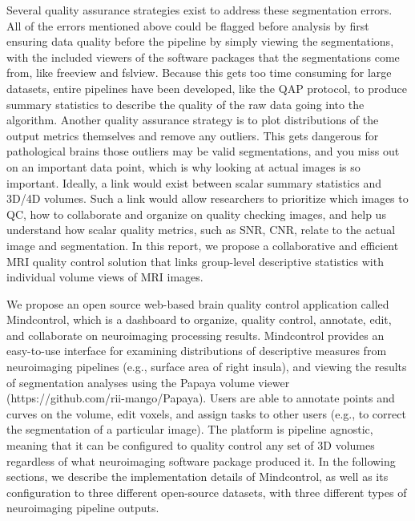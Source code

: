 Several quality assurance strategies exist to address these segmentation errors. All of the errors mentioned above could be flagged before analysis by first ensuring data quality before the pipeline by simply viewing the segmentations, with the included viewers of the software packages that the segmentations come from, like freeview and fslview. Because this gets too time consuming for large datasets, entire pipelines have been developed, like the QAP protocol, to produce summary statistics to describe the quality of the raw data going into the algorithm. Another quality assurance strategy is to plot distributions of the output metrics themselves and remove any outliers. This gets dangerous for pathological brains those outliers may be valid segmentations, and you miss out on an important data point, which is why looking at actual images is so important. Ideally, a link would exist between scalar summary statistics and 3D/4D volumes. Such a link would allow researchers to prioritize which images to QC, how to collaborate and organize on quality checking images, and help us understand how scalar quality metrics, such as SNR, CNR, relate to the actual image and segmentation. In this report, we propose a collaborative and efficient MRI quality control solution that links group-level descriptive statistics with individual volume views of MRI images.  

We propose an open source web-based brain quality control application called Mindcontrol, which is a dashboard to organize, quality control, annotate, edit, and collaborate on neuroimaging processing results. Mindcontrol provides an easy-to-use interface for examining distributions of descriptive measures from neuroimaging pipelines (e.g., surface area of right insula), and viewing the results of segmentation analyses using the Papaya volume viewer (https://github.com/rii-mango/Papaya). Users are able to annotate points and curves on the volume, edit voxels, and assign tasks to other users (e.g., to correct the segmentation of a particular image). The platform is pipeline agnostic, meaning that it can be configured to quality control any set of 3D volumes regardless of what neuroimaging software package produced it. In the following sections, we describe the implementation details of Mindcontrol, as well as its configuration to three different open-source datasets, with three different types of neuroimaging pipeline outputs. 

